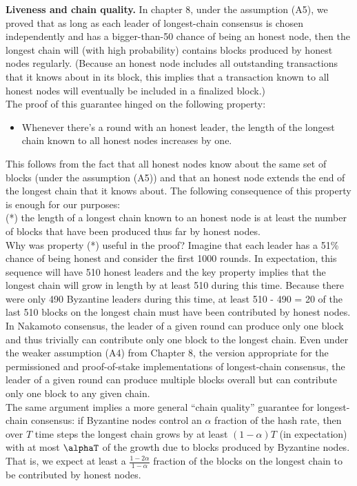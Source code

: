 \noindent
\textbf{Liveness and chain quality.} In chapter 8, under the assumption (A5), we proved that as long
as each leader of longest-chain consensus is chosen independently and has a bigger-than-50%
chance of being an honest node, then the longest chain will (with high probability) contains
blocks produced by honest nodes regularly. (Because an honest node includes all
outstanding transactions that it knows about in its block, this implies that a transaction
known to all honest nodes will eventually be included in a finalized block.)\\
The proof of this guarantee hinged on the following property:\\
\begin{itemize}
    \item Whenever there’s a round with an honest leader, the length of the longest chain known
to all honest nodes increases by one.
\end{itemize}
This follows from the fact that all honest nodes know about the same set of blocks
(under the assumption (A5)) and that an honest node extends the end of the longest chain that it
knows about. The following consequence of this property is enough for our purposes:\\

(*) the length of a longest chain known to an honest node is at least the number of blocks
that have been produced thus far by honest nodes.\\

Why was property (*) useful in the proof? Imagine that each leader has a 51\% chance of
being honest and consider the first 1000 rounds. In expectation, this sequence will have 510
honest leaders and the key property implies that the longest chain will grow in length by
at least 510 during this time. Because there were only 490 Byzantine leaders during this
time, at least 510 - 490 = 20 of the last 510 blocks on the longest chain must have been
contributed by honest nodes. In Nakamoto consensus, the leader of a given round can produce only one block and thus trivially can
contribute only one block to the longest chain. Even under the weaker assumption (A4) from Chapter 8, the
version appropriate for the permissioned and proof-of-stake implementations of longest-chain consensus, the
leader of a given round can produce multiple blocks overall but can contribute only one block to any given
chain.\\

The same argument implies a more general “chain quality” guarantee for longest-chain
consensus: if Byzantine nodes control an $\alpha$ fraction of the hash rate, then over $T$ time steps
the longest chain grows by at least $(1 - \alpha)T$ (in expectation) with at most $\alphaT$ of the growth
due to blocks produced by Byzantine nodes. That is, we expect at least a $\frac{1 - 2\alpha}{1 - \alpha}$
fraction of the blocks on the longest chain to be contributed by honest nodes.\\

